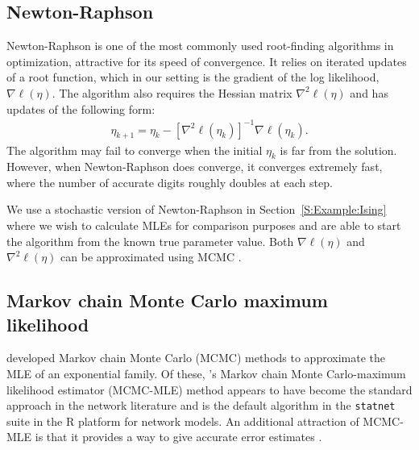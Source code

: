 \subsection{Newton-Raphson}
Newton-Raphson is one of the most commonly used root-finding algorithms
in optimization, attractive
for its speed of convergence.  It relies on iterated updates of a root 
function, which in our setting is the gradient of the log likelihood, $\nabla \ell(\eta)$.  
The algorithm also requires the Hessian matrix $\nabla^2 \ell(\eta)$ and has updates 
of the following form:
\begin{align}
	\eta_{k+1} = \eta_k - \left[ \nabla^2 \ell(\eta_k) \right ]^{-1} \nabla \ell(\eta_k).
\end{align}
The algorithm may fail to 
converge when the initial $\eta_k$ is far from the solution.  However,
when Newton-Raphson does converge, it converges extremely fast, 
where the number of accurate digits roughly doubles at each step.

We use a stochastic version of Newton-Raphson in Section~\ref{S:Example:Ising} where 
we wish to calculate MLEs for comparison purposes and are able to start the algorithm from the known true parameter value.
Both $\nabla \ell(\eta)$ and $\nabla^2 \ell(\eta)$ can be approximated using MCMC 
 \citep{Penttinen:1984}.
\subsection{Markov chain Monte Carlo maximum likelihood} \label{S:MCMC-MLE}
\citet{Geyer:1992, Corander:1998, Snijders:2002} developed Markov chain Monte Carlo 
(MCMC) methods to approximate the MLE of an exponential family.  Of these, \citeauthor
{Geyer:1992}'s Markov chain Monte Carlo-maximum likelihood estimator (MCMC-MLE) method 
appears to have become the standard approach in the network literature 
\citep{Hunter:2006, Handcock:2006, GOF} and is the default algorithm in 
the \texttt{statnet} suite \citep{statnet:R} in the R platform for network models.  
An additional attraction of MCMC-MLE is that it provides a way to give accurate error 
estimates \citep{Geyer:1994,Hunter:2006}.

